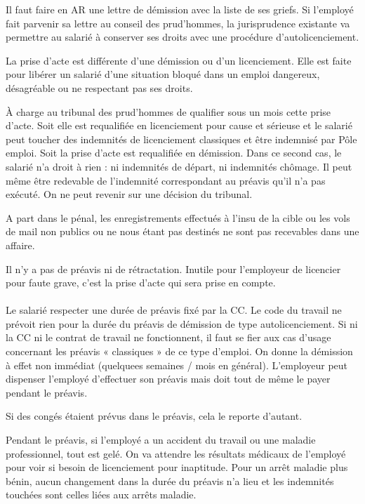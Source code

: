 Il faut faire en AR une lettre de démission avec la liste de ses griefs.
Si l’employé fait parvenir sa lettre au conseil des prud’hommes, la jurisprudence existante va permettre au salarié à conserver ses droits avec une procédure d’autolicenciement.

La prise d'acte est différente d'une démission ou d'un licenciement.
Elle est faite pour libérer un salarié d’une situation bloqué dans un emploi dangereux, désagréable ou ne respectant pas ses droits.

À charge au tribunal des prud’hommes de qualifier sous un mois cette prise d’acte.
Soit elle est requalifiée en licenciement pour cause et sérieuse et le salarié peut toucher des indemnités de licenciement classiques et être indemnisé par Pôle emploi.
Soit la prise d’acte est requalifiée en démission.
Dans ce second cas, le salarié n’a droit à rien : ni indemnités de départ, ni indemnités chômage.
Il peut même être redevable de l’indemnité correspondant au préavis qu’il n’a pas exécuté.
On ne peut revenir sur une décision du tribunal.

A part dans le pénal, les enregistrements effectués à l’insu de la cible ou les vols de mail non publics ou ne nous étant pas destinés ne sont pas recevables dans une affaire.

Il n'y a pas de préavis ni de rétractation.
Inutile pour l’employeur de licencier pour faute grave, c’est la prise d’acte qui sera prise en compte.

\paragraph{}
Le salarié respecter une durée de préavis fixé par la CC.
Le code du travail ne prévoit rien pour la durée du préavis de démission de type autolicenciement.
Si ni la CC ni le contrat de travail ne fonctionnent, il faut se fier aux cas d’usage concernant les préavis « classiques » de ce type d’emploi.
On donne la démission à effet non immédiat (quelquees semaines / mois en général).
L’employeur peut dispenser l’employé d’effectuer son préavis mais doit tout de même le payer pendant le préavis.

Si des congés étaient prévus dans le préavis, cela le reporte d'autant.

Pendant le préavis, si l’employé a un accident du travail ou une maladie professionnel, tout est gelé.
On va attendre les résultats médicaux de l’employé pour voir si besoin de licenciement pour inaptitude.
Pour un arrêt maladie plus bénin, aucun changement dans la durée du préavis n'a lieu et les indemnités touchées sont celles liées aux arrêts maladie.

